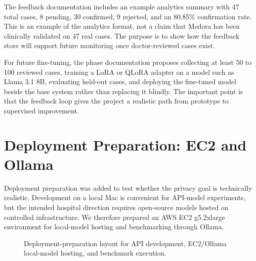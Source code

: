 The feedback documentation includes an example analytics summary with 47 total cases, 8 pending, 30 confirmed, 9 rejected, and an 80.85\% confirmation rate. This is an example of the analytics format, not a claim that Medora has been clinically validated on 47 real cases. The purpose is to show how the feedback store will support future monitoring once doctor-reviewed cases exist.

For future fine-tuning, the phase documentation proposes collecting at least 50 to 100 reviewed cases, training a LoRA or QLoRA adapter on a model such as Llama 3.1 8B, evaluating held-out cases, and deploying the fine-tuned model beside the base system rather than replacing it blindly. The important point is that the feedback loop gives the project a realistic path from prototype to supervised improvement.

\section{Deployment Preparation: EC2 and Ollama}

Deployment preparation was added to test whether the privacy goal is technically realistic. Development on a local Mac is convenient for API-model experiments, but the intended hospital direction requires open-source models hosted on controlled infrastructure. We therefore prepared an AWS EC2 g5.2xlarge environment for local-model hosting and benchmarking through Ollama.

\begin{figure}[htbp]
\centering
{}
\caption{Deployment-preparation layout for API development, EC2/Ollama local-model hosting, and benchmark execution.}
\label{fig:deployment_preparation}
\end{figure}

